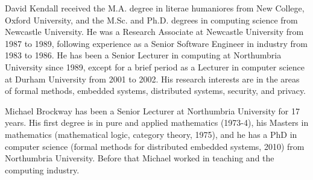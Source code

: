 \documentclass{ieeeaccess}
\begin{document}
\begin{IEEEbiography}{David Kendall}
received the M.A. degree in literae humaniores from New College, Oxford University, and the M.Sc. and Ph.D. degrees in computing science from Newcastle University. He was a Research Associate at Newcastle University from 1987 to 1989, following experience as a Senior Software Engineer in industry from 1983 to 1986. He has been a Senior Lecturer in computing at Northumbria University since 1989, except for a brief period as a Lecturer in computer science at Durham University from 2001 to 2002. His research interests are in the areas of formal methods, embedded systems, distributed systems, security, and privacy.
\end{IEEEbiography}

\begin{IEEEbiography}{Michael Brockway}
has been a Senior Lecturer at Northumbria University for 17 years. His first degree is in pure and applied mathematics (1973-4), his Masters in mathematics (mathematical logic, category theory, 1975), and he has a PhD in computer science (formal methods for distributed embedded systems, 2010) from Northumbria University. Before that Michael worked in teaching and the computing industry.
\end{IEEEbiography}

\EOD
\end{document}
